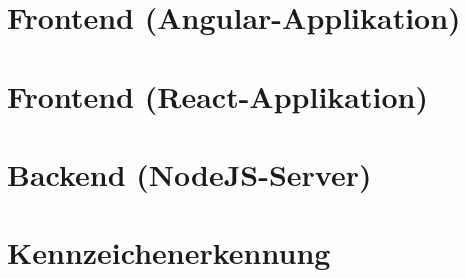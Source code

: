 \section{Frontend (Angular-Applikation)}
\lipsum[5-12]

\section{Frontend (React-Applikation)}
\lipsum[5-12]

\section{Backend (NodeJS-Server)}
\lipsum[5-12]

\section{Kennzeichenerkennung}
\lipsum[5-12]